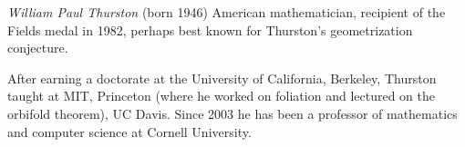 \documentclass[12pt]{article}
\begin{document}
\emph{William Paul Thurston} (born 1946) American mathematician, recipient of the Fields medal in 1982, perhaps best known for Thurston's geometrization conjecture. 

After earning a doctorate  at the University of California, Berkeley, Thurston taught at MIT, Princeton (where he worked on foliation and lectured on the orbifold theorem), UC Davis. Since 2003 he has been a professor of mathematics and computer science at Cornell University.


\end{document}
